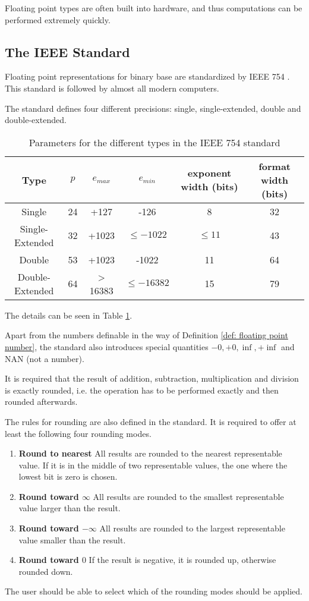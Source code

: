 Floating point types are often built into hardware, and thus computations can
be performed extremely quickly.
\subsection{The IEEE Standard}
	Floating point representations for binary base are standardized by IEEE 754 \cite{ieee}. 
	This standard is followed by almost all modern computers.

	The standard defines four different precisions: single, single-extended, double and double-extended.
  \begin{table}
	  	\centering
	    \begin{tabular}{ | c || c | c | c | c | c | }
	    \hline
	    Type & $p$ & $e_{max}$ & $e_{min}$ & exponent width (bits) & format width (bits) \\ \hline \hline
	    Single & 24 & +127 & -126 & 8 & 32 \\ \hline
	    Single-Extended & 32 & +1023 & $\leq -1022$ & $\leq 11$ & 43 \\ \hline
	    Double & 53 & +1023 & -1022 & 11 & 64 \\ \hline
	    Double-Extended & 64 & > 16383 & $\leq -16382$ & 15 & 79 \\ \hline
	    \end{tabular}
	    \caption{Parameters for the different types in the IEEE 754 standard}\label{table:IEEE floating point}
 \end{table}
 The details can be seen in Table \ref{table:IEEE floating point}.

 Apart from the numbers definable in the way of Definition \ref{def:
 floating point number}, the standard also introduces special quantities $-0, +0, \inf, +\inf$ and NAN (not a number). 
    
	It is required that the result of addition, subtraction, multiplication and division is exactly rounded, 
	i.e. the operation has to be performed exactly and then rounded afterwards.
	
  The rules for rounding are also defined in the standard.
  It is required to offer at least the following four rounding modes.
  \begin{enumerate}
    \item \textbf{Round to nearest} 
      All results are rounded to the nearest representable value. 
      If it is in the middle of two representable values, the one where the
      lowest bit is zero is chosen.
    \item \textbf{Round toward $\infty$}
      All results are rounded to the smallest representable value larger than
      the result.
    \item \textbf{Round toward $-\infty$}
      All results are rounded to the largest representable value smaller than
      the result.
    \item \textbf{Round toward $0$}
      If the result is negative, it is rounded up, otherwise rounded down.
  \end{enumerate}
  The user should be able to select which of the rounding modes should be
  applied.
